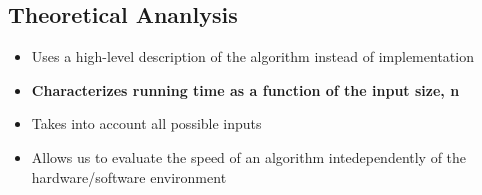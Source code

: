 \documentclass{article}
\begin{document}
\begin{flushleft}
\section{Theoretical Ananlysis}
\begin{itemize}
	\item Uses a high-level description of the algorithm instead of implementation
	\item \textbf{Characterizes running time as a function of the input size, n}
	\item Takes into account all possible inputs
	\item Allows us to evaluate the speed of an algorithm intedependently of the hardware/software environment
\end{itemize}
\end{flushleft}
\end{document}
